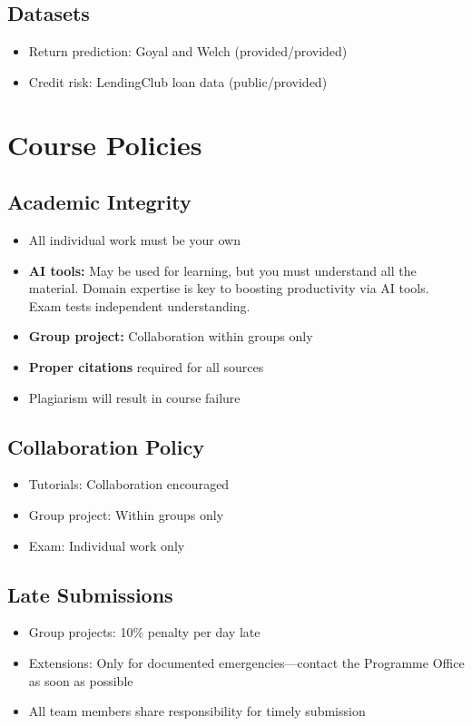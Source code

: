 \documentclass[11pt,a4paper]{article}
\begin{document}
\subsection{Datasets}
\begin{itemize}[leftmargin=*]
    \item Return prediction: Goyal and Welch (provided/provided)
    \item Credit risk: LendingClub loan data (public/provided)
\end{itemize}

\section{Course Policies}

\subsection{Academic Integrity}
\begin{itemize}[leftmargin=*]
    \item All individual work must be your own
    \item \textbf{AI tools:} May be used for learning, but you must understand all the material. Domain expertise is key to boosting productivity via AI tools. Exam tests independent understanding.
    \item \textbf{Group project:} Collaboration within groups only
    \item \textbf{Proper citations} required for all sources
    \item Plagiarism will result in course failure
\end{itemize}

\subsection{Collaboration Policy}
\begin{itemize}[leftmargin=*]
    \item Tutorials: Collaboration encouraged
    \item Group project: Within groups only
    \item Exam: Individual work only
\end{itemize}

\subsection{Late Submissions}
\begin{itemize}[leftmargin=*]
    \item Group projects: 10\% penalty per day late
    \item Extensions: Only for documented emergencies---contact the Programme Office as soon as possible
    \item All team members share responsibility for timely submission
\end{itemize}
\end{document}
